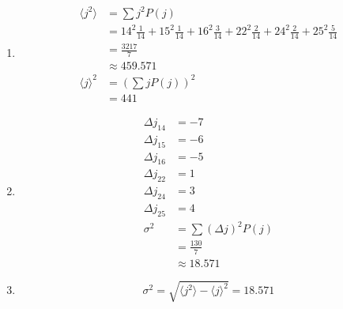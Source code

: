 \documentclass{article}
\begin{document}
\begin{enumerate}
  \item

        \begin{align*}
          \langle j^2 \rangle & = \sum j^2 P(j)                                                                                                         \\
                              & = 14^2 \frac{1}{14} + 15^2 \frac{1}{14} + 16^2 \frac{3}{14} + 22^2 \frac{2}{14} + 24^2 \frac{2}{14} + 25^2 \frac{5}{14} \\
                              & = \frac{3217}{7}                                                                                                        \\
                              & \approx 459.571                                                                                                         \\
          \langle j \rangle^2 & = \left( \sum j P(j) \right)^2                                                                                          \\
                              & = 441
        \end{align*}

  \item

        \begin{align*}
          \Delta j_{14} & = -7                     \\
          \Delta j_{15} & = -6                     \\
          \Delta j_{16} & = -5                     \\
          \Delta j_{22} & = 1                      \\
          \Delta j_{24} & = 3                      \\
          \Delta j_{25} & = 4                      \\
          \sigma^2      & = \sum (\Delta j)^2 P(j) \\
                        & = \frac{130}{7}          \\
                        & \approx 18.571
        \end{align*}

  \item \[\sigma^2 = \sqrt{\langle j^2 \rangle - \langle j \rangle^2} = 18.571\]
\end{enumerate}

\subsection{}
\end{document}
